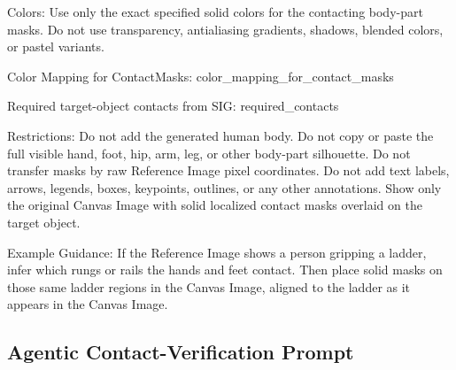 \begin{promptblock}
Colors:
Use only the exact specified solid colors for the contacting body-part masks. Do not use transparency, antialiasing gradients, shadows, blended colors, or pastel variants.

Color Mapping for ContactMasks:
{color_mapping_for_contact_masks}

Required target-object contacts from SIG:
{required_contacts}

Restrictions:
Do not add the generated human body.
Do not copy or paste the full visible hand, foot, hip, arm, leg, or other body-part silhouette.
Do not transfer masks by raw Reference Image pixel coordinates.
Do not add text labels, arrows, legends, boxes, keypoints, outlines, or any other annotations.
Show only the original Canvas Image with solid localized contact masks overlaid on the target object.

Example Guidance:
If the Reference Image shows a person gripping a ladder, infer which rungs or rails the hands and feet contact. Then place solid masks on those same ladder regions in the Canvas Image, aligned to the ladder as it appears in the Canvas Image.
\end{promptblock}

\subsection{Agentic Contact-Verification Prompt}
\label{app:prompt-contact-eval}

